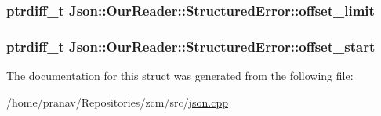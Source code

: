 \subsubsection[{\texorpdfstring{offset\+\_\+limit}{offset_limit}}]{\setlength{\rightskip}{0pt plus 5cm}ptrdiff\+\_\+t Json\+::\+Our\+Reader\+::\+Structured\+Error\+::offset\+\_\+limit}\hypertarget{structJson_1_1OurReader_1_1StructuredError_a15491a751a39c5153af04e68b1d0abb9}{}\label{structJson_1_1OurReader_1_1StructuredError_a15491a751a39c5153af04e68b1d0abb9}
\subsubsection[{\texorpdfstring{offset\+\_\+start}{offset_start}}]{\setlength{\rightskip}{0pt plus 5cm}ptrdiff\+\_\+t Json\+::\+Our\+Reader\+::\+Structured\+Error\+::offset\+\_\+start}\hypertarget{structJson_1_1OurReader_1_1StructuredError_a102677698afb8177c985e72dafe72b15}{}\label{structJson_1_1OurReader_1_1StructuredError_a102677698afb8177c985e72dafe72b15}


The documentation for this struct was generated from the following file\+:\begin{DoxyCompactItemize}
\item 
/home/pranav/\+Repositories/zcm/src/\hyperlink{json_8cpp}{json.\+cpp}\end{DoxyCompactItemize}
